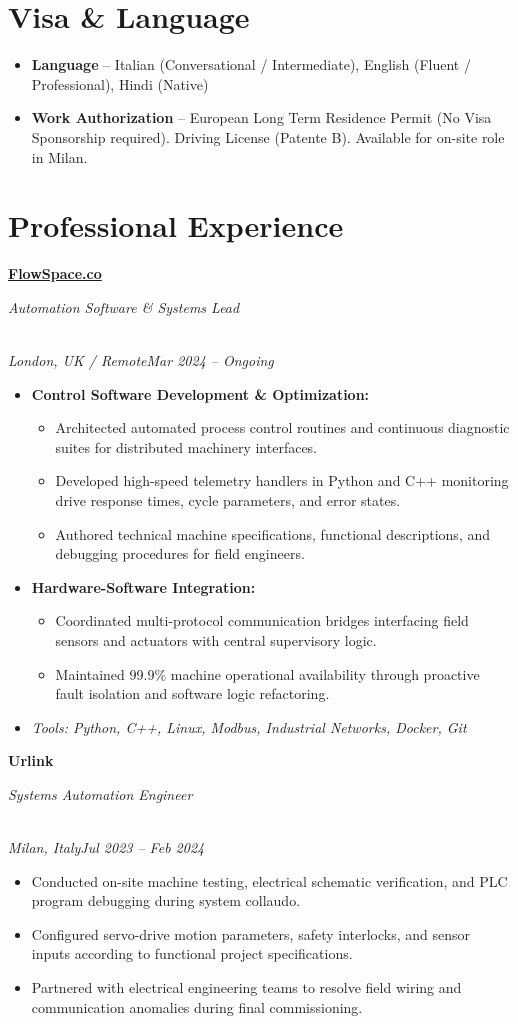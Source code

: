 \documentclass[a4paper,10pt]{article}
\newcommand{\role}[4]{\vspace{3pt}\noindent\hspace{0.6em}\parbox[t]{0.38\textwidth}{\raggedright\textbf{#1}}\hfill\parbox[t]{0.58\textwidth}{\raggedleft\textit{#2}}\\{\textit{#3}\hfill\textit{#4}}\vspace{1pt}}
\begin{document}
\section{Visa \& Language}
\begin{itemize}
\item \textbf{Language} -- Italian (Conversational / Intermediate), English (Fluent / Professional), Hindi (Native)
\item \textbf{Work Authorization} -- European Long Term Residence Permit (No Visa Sponsorship required). Driving License (Patente B). Available for on-site role in Milan.
\end{itemize}

\section{Professional Experience}
\role{\href{https://flowspace.co}{FlowSpace.co}}{Automation Software \& Systems Lead}{London, UK / Remote}{Mar 2024 -- Ongoing}
\begin{itemize}
\item \textbf{Control Software Development \& Optimization:}
\begin{itemize}[label=--]
\item Architected automated process control routines and continuous diagnostic suites for distributed machinery interfaces.
\item Developed high-speed telemetry handlers in Python and C++ monitoring drive response times, cycle parameters, and error states.
\item Authored technical machine specifications, functional descriptions, and debugging procedures for field engineers.
\end{itemize}
\item \textbf{Hardware-Software Integration:}
\begin{itemize}[label=--]
\item Coordinated multi-protocol communication bridges interfacing field sensors and actuators with central supervisory logic.
\item Maintained 99.9\% machine operational availability through proactive fault isolation and software logic refactoring.
\end{itemize}
\item \textit{Tools: Python, C++, Linux, Modbus, Industrial Networks, Docker, Git}
\end{itemize}

\role{Urlink}{Systems Automation Engineer}{Milan, Italy}{Jul 2023 -- Feb 2024}
\begin{itemize}
\item Conducted on-site machine testing, electrical schematic verification, and PLC program debugging during system collaudo.
\item Configured servo-drive motion parameters, safety interlocks, and sensor inputs according to functional project specifications.
\item Partnered with electrical engineering teams to resolve field wiring and communication anomalies during final commissioning.
\end{itemize}
\end{document}
